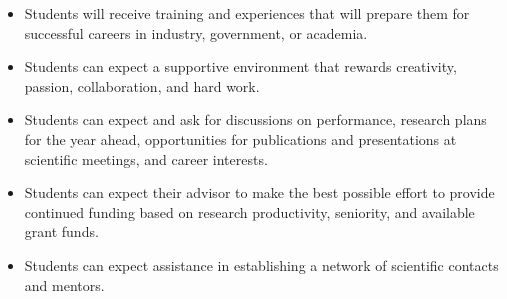 \documentclass[12pt,twoside]{article}
\begin{document}
\begin{itemize}
\item Students will receive training and experiences that will prepare them for successful careers in industry, government, or academia.
\item Students can expect a supportive environment that rewards creativity, passion, collaboration, and hard work.
\item Students can expect and ask for discussions on performance, research plans for the year ahead, opportunities for publications and presentations at scientific meetings, and career interests.
\item Students can expect their advisor to make the best possible effort to provide continued funding based on research productivity, seniority, and available grant funds.
\item Students can expect assistance in establishing a network of scientific contacts and mentors.
\end{itemize}
\end{document}
